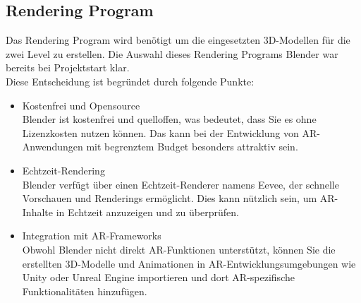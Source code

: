 \subsection{Rendering Program}
Das Rendering Program wird benötigt um die eingesetzten 3D-Modellen für die zwei
Level zu erstellen. Die Auswahl dieses Rendering Programs Blender war bereits bei Projektstart
klar. \\
Diese Entscheidung ist begründet durch folgende Punkte:
\begin{itemize}
    \item Kostenfrei und Opensource\\
    Blender ist kostenfrei und quelloffen, was bedeutet, dass Sie es ohne Lizenzkosten nutzen
    können. Das kann bei der Entwicklung von AR-Anwendungen mit begrenztem Budget besonders
    attraktiv sein.
    \item Echtzeit-Rendering\\
    Blender verfügt über einen Echtzeit-Renderer namens Eevee, der schnelle Vorschauen und
    Renderings ermöglicht. Dies kann nützlich sein, um AR-Inhalte in Echtzeit anzuzeigen und zu
    überprüfen.
    \item Integration mit AR-Frameworks\\
    Obwohl Blender nicht direkt AR-Funktionen unterstützt, können Sie die erstellten 3D-Modelle
    und Animationen in AR-Entwicklungsumgebungen wie Unity oder Unreal Engine importieren und
    dort AR-spezifische Funktionalitäten hinzufügen.
\end{itemize}
